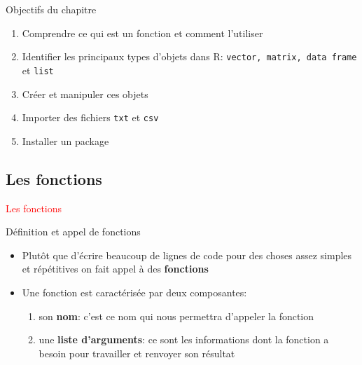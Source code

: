 \documentclass[11pt]{beamer}\usepackage[]{graphicx}\usepackage[]{color}
\newcommand{\code}[1]{\texttt{#1}}
\begin{document}
\begin{frame}[plain]
\hspace*{-1.0cm}\parbox[t]{\textwidth}{
\begin{block}{Objectifs du chapitre}
\begin{enumerate}
\item Comprendre ce qui est un fonction et comment l'utiliser
\item Identifier les principaux types d'objets dans R: \code{vector, matrix, data frame} et \code{list} 
\item Cr\'{e}er et manipuler ces objets
\item Importer des fichiers \code{txt} et \code{csv}
\item Installer un package
\end{enumerate}
\end{block}
}
\end{frame}





\subsection{Les fonctions}

\begin{frame}
 \begin{center}
  \Huge{\textcolor{red}{Les fonctions}}
 \end{center}
\end{frame}



\begin{frame}{Définition et appel de fonctions}
\begin{itemize}
 \setlength\itemsep{2em}
\item Plutôt que d'écrire beaucoup de lignes de code pour des choses assez simples et répétitives on fait appel à des \textbf{fonctions}
\pause \item Une fonction est caractérisée par deux composantes:
\pause 
\begin{enumerate}
\normalsize
\item son \textbf{nom}: c'est ce nom qui nous permettra d'appeler la fonction
\pause \item une \textbf{liste d'arguments}: ce sont les informations dont la fonction a besoin pour travailler et renvoyer son résultat
\end{enumerate}
\end{itemize}
\end{frame}
\end{document}
